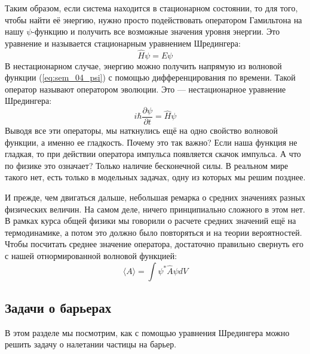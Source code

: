 \documentclass[12pt]{article}
\begin{document}
\vspace{1em} \noindent
Таким образом, если система находится в стационарном состоянии, то для того, чтобы найти её энергию, нужно просто подействовать оператором Гамильтона на нашу $\psi$-функцию и получить все возможные значения уровня энергии. Это уравнение и называется стационарным уравнением Шредингера:
\begin{equation}
\label{eq:sem_04_schrodinger}
    \hat{H}\psi = E\psi
\end{equation}
В нестационарном случае, энергию можно получить напрямую из волновой функции (\ref{eq:sem_04_psi}) с помощью дифференцирования по времени. Такой оператор называют оператором эволюции. Это --- нестационарное уравнение Шредингера:
\begin{equation*}
    i\hbar\dfrac{\partial\psi}{\partial t} = \hat{H}\psi
\end{equation*}
Выводя все эти операторы, мы наткнулись ещё на одно свойство волновой функции, а именно ее гладкость. Почему это так важно? Если наша функция не гладкая, то при действии оператора импульса появляется скачок импульса. А что по физике это означает? Только наличие бесконечной силы. В реальном мире такого нет, есть только в модельных задачах, одну из которых мы решим позднее.

\vspace{1em} \noindent
И прежде, чем двигаться дальше, небольшая ремарка о средних значениях разных физических величин. На самом деле, ничего принципиально сложного в этом нет. В рамках курса общей физики мы говорили о расчете средних значений ещё на термодинамике, а потом это должно было повторяться и на теории вероятностей. Чтобы посчитать среднее значение оператора, достаточно правильно свернуть его с нашей отнормированной волновой функцией:
\begin{equation*}
    \langle A\rangle = \int\psi^*\hat{A}\psi dV
\end{equation*}

\subsection{Задачи о барьерах}
В этом разделе мы посмотрим, как с помощью уравнения Шредингера можно решить задачу о налетании частицы на барьер. 
\end{document}
